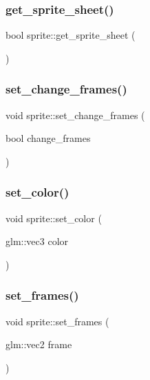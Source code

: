 \subsubsection{\texorpdfstring{get\+\_\+sprite\+\_\+sheet()}{get\_sprite\_sheet()}}
{\footnotesize\ttfamily bool sprite\+::get\+\_\+sprite\+\_\+sheet (\begin{DoxyParamCaption}{ }\end{DoxyParamCaption})\hspace{0.3cm}{\ttfamily [inline]}}

\mbox{\label{classsprite_ab682d38f77706a999f53a1e62bf2539e}} 
\subsubsection{\texorpdfstring{set\+\_\+change\+\_\+frames()}{set\_change\_frames()}}
{\footnotesize\ttfamily void sprite\+::set\+\_\+change\+\_\+frames (\begin{DoxyParamCaption}\item[{bool}]{change\+\_\+frames }\end{DoxyParamCaption})\hspace{0.3cm}{\ttfamily [inline]}}

\mbox{\label{classsprite_ad9ead060273297a219478f570e17e399}} 
\subsubsection{\texorpdfstring{set\+\_\+color()}{set\_color()}}
{\footnotesize\ttfamily void sprite\+::set\+\_\+color (\begin{DoxyParamCaption}\item[{glm\+::vec3}]{color }\end{DoxyParamCaption})\hspace{0.3cm}{\ttfamily [inline]}}

\mbox{\label{classsprite_aeaf9e60fb358bf55a1dd9be38e841ea5}} 
\subsubsection{\texorpdfstring{set\+\_\+frames()}{set\_frames()}}
{\footnotesize\ttfamily void sprite\+::set\+\_\+frames (\begin{DoxyParamCaption}\item[{glm\+::vec2}]{frame }\end{DoxyParamCaption})\hspace{0.3cm}{\ttfamily [inline]}}


